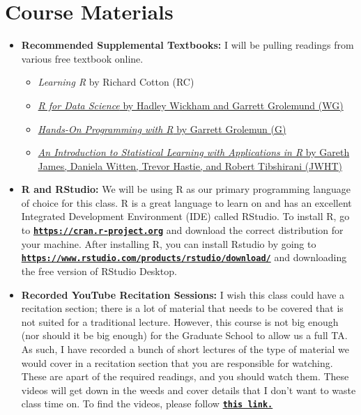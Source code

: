 \documentclass[11pt]{article}
\begin{document}
\section*{Course Materials}

\begin{itemize}

    \item \textbf{Recommended Supplemental Textbooks:} 
    I will be pulling readings from various free textbook online. 
    \begin{itemize}
        \item \textit{Learning R} by Richard Cotton (RC)
        \item \href{https://r4ds.had.co.nz}{\textit{R for Data Science} by Hadley Wickham and Garrett Grolemund (WG)}
        \item \href{https://rstudio-education.github.io/hopr/}{\textit{Hands-On Programming with R} by Garrett Grolemun (G)}
        \item \href{https://web.stanford.edu/~hastie/ISLRv2_website.pdf}{\textit{An Introduction to Statistical Learning with Applications in R} by Gareth James, Daniela Witten, Trevor Hastie, and Robert Tibshirani (JWHT)}
    \end{itemize}
    
    \item \textbf{R and RStudio:} We will be using R as our primary programming language of choice for this class. R is a great language to learn on and has an excellent Integrated Development Environment (IDE) called RStudio. To install R, go to \href{https://cran.r-project.org}{\tt\bf https://cran.r-project.org} and download the correct distribution for your machine. After installing R, you can install Rstudio by going to \href{https://www.rstudio.com/products/rstudio/download/}{\tt\bf https://www.rstudio.com/products/rstudio/download/} and downloading the free version of RStudio Desktop.
    
    \item \textbf{Recorded YouTube Recitation Sessions:} I wish this class could have a recitation section; there is a lot of material that needs to be covered that is not suited for a traditional lecture. However, this course is not big enough (nor should it be big enough) for the Graduate School to allow us a full TA. As such, I have recorded a bunch of short lectures of the type of material we would cover in a recitation section that you are responsible for watching. These are apart of the required readings, and you should watch them. These videos will get down in the weeds and cover details that I don't want to waste class time on. To find the videos, please follow \href{https://www.youtube.com/channel/UCbknPag-RS6tSptYAJaIsJg}{\tt\bf this link.}
    

\end{itemize}
\end{document}
